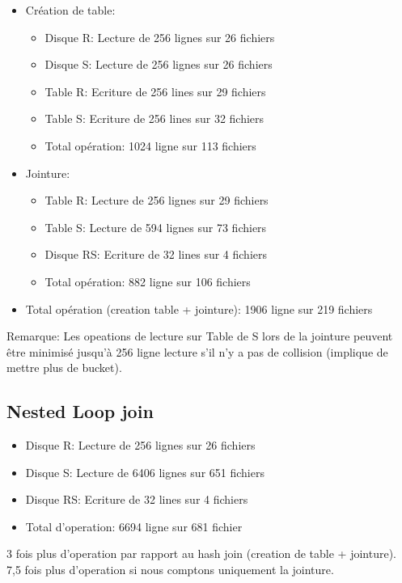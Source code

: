 \documentclass[a4paper]{article}
\begin{document}
\begin{itemize}
  \item Création de table:
  \begin{itemize}
    \item Disque R: Lecture de 256 lignes sur 26 fichiers
    \item Disque S: Lecture de 256 lignes sur 26 fichiers
    \item Table R: Ecriture de 256 lines sur 29 fichiers
    \item Table S: Ecriture de 256 lines sur 32 fichiers
    \item Total opération: 1024 ligne sur 113 fichiers
  \end{itemize}
  \item Jointure:
  \begin{itemize}
      \item Table R: Lecture de 256 lignes sur 29 fichiers
      \item Table S: Lecture de 594 lignes sur 73 fichiers
      \item Disque RS: Ecriture de 32 lines sur 4 fichiers
      \item Total opération: 882 ligne sur 106 fichiers
  \end{itemize}
  \item Total opération (creation table + jointure): 1906 ligne sur 219 fichiers
\end{itemize}

Remarque: Les opeations de lecture sur Table de S lors de la jointure peuvent
être minimisé jusqu'à 256 ligne lecture s'il n'y a pas de collision
(implique de mettre plus de bucket).

\subsection{Nested Loop join}

\begin{itemize}
  \item Disque R: Lecture de 256 lignes sur 26 fichiers
  \item Disque S: Lecture de 6406 lignes sur 651 fichiers
  \item Disque RS: Ecriture de 32 lines sur 4 fichiers
  \item Total d'operation: 6694 ligne sur 681 fichier
\end{itemize}

3 fois plus d'operation par rapport au hash join (creation de table + jointure).
7,5 fois plus d'operation si nous comptons uniquement la jointure.
\end{document}
